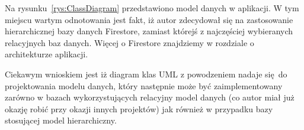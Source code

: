 Na rysunku~\ref{rys:ClassDiagram} przedstawiono model danych w aplikacji.
W tym miejscu wartym odnotowania jest fakt, iż autor zdecydował się
na zastosowanie hierarchicznej bazy danych Firestore, zamiast którejś z najczęściej
wybieranych relacyjnych baz danych.
Więcej o Firestore znajdziemy w rozdziale o architekturze aplikacji.

Ciekawym wnioskiem jest iż diagram klas UML z powodzeniem nadaje się do projektowania
modelu danych, który następnie może być zaimplementowany zarówno w bazach
wykorzystujących relacyjny model danych (co autor miał już okazję robić
przy okazji innych projektów) jak również w przypadku bazy stosującej
model hierarchiczny.
